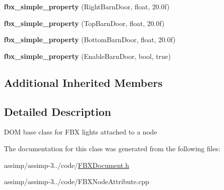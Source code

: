 \begin{DoxyCompactItemize}
\item 
\hypertarget{class_assimp_1_1_f_b_x_1_1_light_ad5db994f8f21741de4260b5f99a036d5}{{\bfseries fbx\+\_\+simple\+\_\+property} (Right\+Barn\+Door, float, 20.\+0f)}\label{class_assimp_1_1_f_b_x_1_1_light_ad5db994f8f21741de4260b5f99a036d5}

\item 
\hypertarget{class_assimp_1_1_f_b_x_1_1_light_abe44063817a2bdf9a11dbaa59c6304f6}{{\bfseries fbx\+\_\+simple\+\_\+property} (Top\+Barn\+Door, float, 20.\+0f)}\label{class_assimp_1_1_f_b_x_1_1_light_abe44063817a2bdf9a11dbaa59c6304f6}

\item 
\hypertarget{class_assimp_1_1_f_b_x_1_1_light_afe61edecc3d4b6e23b5f4654be12fe37}{{\bfseries fbx\+\_\+simple\+\_\+property} (Bottom\+Barn\+Door, float, 20.\+0f)}\label{class_assimp_1_1_f_b_x_1_1_light_afe61edecc3d4b6e23b5f4654be12fe37}

\item 
\hypertarget{class_assimp_1_1_f_b_x_1_1_light_aadfb43f1c0373eab57a23ed241013532}{{\bfseries fbx\+\_\+simple\+\_\+property} (Enable\+Barn\+Door, bool, true)}\label{class_assimp_1_1_f_b_x_1_1_light_aadfb43f1c0373eab57a23ed241013532}

\end{DoxyCompactItemize}
\subsection*{Additional Inherited Members}


\subsection{Detailed Description}
D\+O\+M base class for F\+B\+X lights attached to a node 

The documentation for this class was generated from the following files\+:\begin{DoxyCompactItemize}
\item 
assimp/assimp-\/3../code/\hyperlink{_f_b_x_document_8h}{F\+B\+X\+Document.\+h}\item 
assimp/assimp-\/3../code/F\+B\+X\+Node\+Attribute.\+cpp\end{DoxyCompactItemize}
